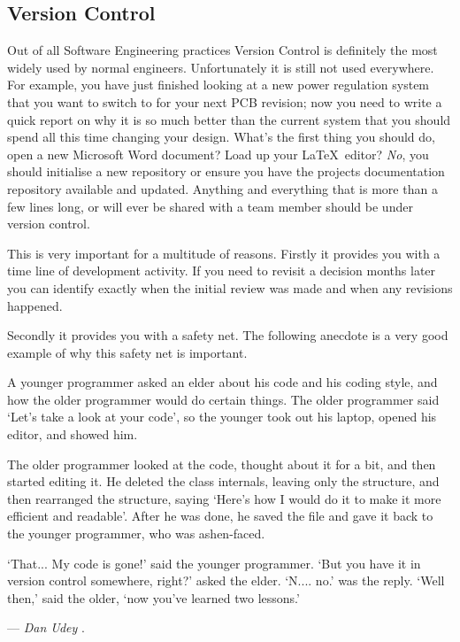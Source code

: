 \subsection{Version Control}

  Out of all Software Engineering practices Version Control is definitely the
  most widely used by normal engineers.  Unfortunately it is still not used
  everywhere.  For example, you have just finished looking at a new power
  regulation system that you want to switch to for your next PCB revision; now
  you need to write a quick report on why it is so much better than the
  current system that you should spend all this time changing your design.
  What's the first thing you should do, open a new Microsoft Word document?
  Load up your \LaTeX\ editor?  \emph{No}, you should initialise a new
  repository or ensure you have the projects documentation repository
  available and updated.  Anything and everything that is more than a few
  lines long, or will ever be shared with a team member should be under
  version control.

  This is very important for a multitude of reasons.  Firstly it provides you
  with a time line of development activity.  If you need to revisit a decision
  months later you can identify exactly when the initial review was made and
  when any revisions happened.
  
  Secondly it provides you with a safety net.  The following anecdote is a
  very good example of why this safety net is important.

  \begin{bigquote}

    {A younger programmer asked an elder about his code and his coding style,
    and how the older programmer would do certain things. The older programmer
    said `Let's take a look at your code', so the younger took out his laptop,
    opened his editor, and showed him.}

    \vspace{5pt}

    {The older programmer looked at the code, thought about it for a bit, and
    then started editing it. He deleted the class internals, leaving only the
    structure, and then rearranged the structure, saying `Here's how I would
    do it to make it more efficient and readable'. After he was done, he saved
    the file and gave it back to the younger programmer, who was ashen-faced.}

    \vspace{5pt}

    {`That... My code is gone!' said the younger programmer. `But you have it
    in version control somewhere, right?' asked the elder. `N.... no.' was the
    reply. `Well then,' said the older, `now you've learned two lessons.'}

    \vspace{5pt}
    
    --- \emph{Dan Udey} \cite{Udey_2008}.

  \end{bigquote}

